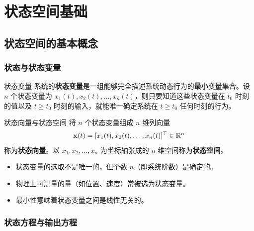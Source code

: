 
\chapter{状态空间基础}


\section{状态空间的基本概念}

\subsection{状态与状态变量}

\begin{mydefinition}{状态变量}
系统的\textbf{状态变量}是一组能够完全描述系统动态行为的\textbf{最小}变量集合。设 $n$ 个状态变量为 $x_1(t), x_2(t), \ldots, x_n(t)$，则只要知道这些状态变量在 $t_0$ 时刻的值以及 $t \geq t_0$ 时刻的输入，就能唯一确定系统在 $t \geq t_0$ 任何时刻的行为。
\end{mydefinition}

\begin{mydefinition}{状态向量与状态空间}
将 $n$ 个状态变量组成 $n$ 维列向量
\[
\mathbf{x}(t) = [x_1(t), x_2(t), \ldots, x_n(t)]^{\top} \in \mathbb{R}^n
\]
称为\textbf{状态向量}。以 $x_1, x_2, \ldots, x_n$ 为坐标轴张成的 $n$ 维空间称为\textbf{状态空间}。
\end{mydefinition}

\begin{itemize}
    \item 状态变量的选取不是唯一的，但个数 $n$（即系统阶数）是确定的。
    \item 物理上可测量的量（如位置、速度）常被选为状态变量。
    \item 最小性意味着状态变量之间是线性无关的。
\end{itemize}

\subsection{状态方程与输出方程}


